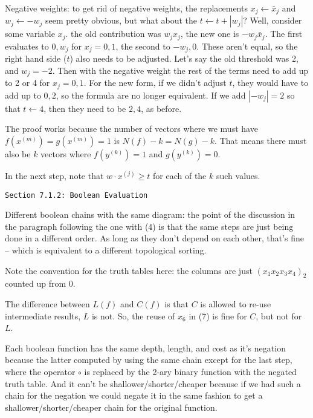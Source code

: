 \vskip0.1in 

\noindent [p75] Negative weights: to get rid of negative weights,
the replacements $x_j \gets \bar x_j$ and $w_j \gets -w_j$ seem
pretty obvious, but what about the $t \gets t + \left|w_j\right|$?
Well, consider some variable $x_j$.  the old contribution was
$w_j x_j$, the new one is $-w_j \bar x_j$.  The first evaluates to
$0, w_j$ for $x_j = 0, 1$, the second to $-w_j, 0$.  These aren't
equal, so the right hand side ($t$) also needs to be adjusted.
Let's say the old threshold was 2, and $w_j = -2$.  Then with
the negative weight the rest of the terms need to add up to 2 or 4
for $x_j = 0, 1$.  For the new form, if we didn't adjust $t$, they
would have to add up to $0, 2$, so the formula are no longer
equivalent.  If we add $\left|-w_j\right| = 2$ so that $t \gets 4$,
then they need to be $2, 4$, as before.

\vskip 0.05in  \hfil\break
The proof works because the number
of vectors where we must have $f\left(x^{\left(m\right)}\right) = 
g\left(x^{\left(m\right)}\right) = 1$ is $N\left(f\right) - k = N\left(g\right) - k$.
That means there must also be $k$ vectors where $f\left(y^{\left(k\right)}\right) = 1$
and $g\left(y^{\left(k\right)}\right) = 0$.

In the next step, note that $w \cdot x^{\left(j\right)} \geq t$ for each of the $k$
such values. 

\vfil\break
\centerline{\tt Section 7.1.2: Boolean Evaluation}
\vskip0.2in

\noindent [p 97] Different boolean chains with the same diagram: the point
of the discussion in the paragraph following the one with (4) is that the same
steps are just being done in a different order.  As long as they don't depend
on each other, that's fine -- which is equivalent to a different topological sorting.

\vskip 0.05in \noindent [p 98] Note the convention for the truth tables here:
the columns are just $\left(x_1 x_2 x_3 x_4\right)_2$ counted up from 0.

\vskip 0.05in \noindent [p 99] The difference between $L\left(f\right)$
and $C\left(f\right)$ is that $C$ is allowed to re-use intermediate results,
$L$ is not.  So, the reuse of $x_6$ in (7) is fine for $C$, but not for $L$.

\vskip 0.1in 

\noindent [p 99] Each boolean function has the same depth, length,
and cost as it's negation because the latter computed by using the same
chain except for the last step, where the operator $\circ$ is replaced
by the 2-ary binary function with the negated truth table.  And it can't
be shallower/shorter/cheaper because if we had such a chain for the
negation we could negate it in the same fashion to get a shallower/shorter/cheaper
chain for the original function.

